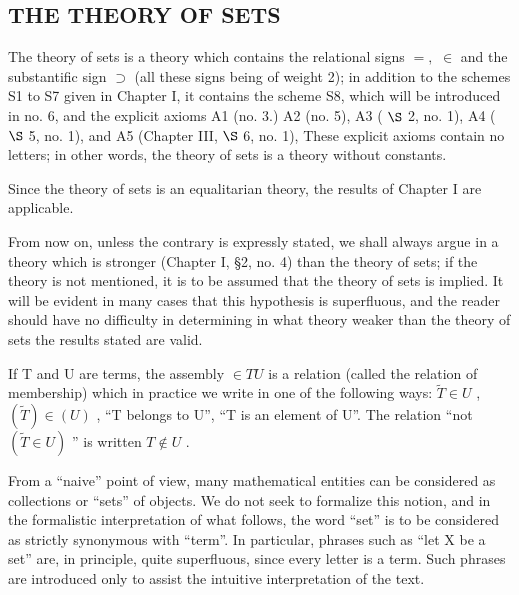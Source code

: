 \subsection{THE THEORY OF SETS}

The theory of sets is a theory which contains the relational signs \(=,\) \(\in\) and the substantific sign \(\supset\) (all these signs being of weight 2); in addition to the schemes S1 to S7 given in Chapter I, it contains the scheme S8, which will be introduced in no. 6, and the explicit axioms A1 (no. 3.) A2 (no. 5), A3 ( \(\S\) 2, no. 1), A4 ( \(\S\) 5, no. 1), and A5 (Chapter III, \(\S\) 6, no. 1), These explicit axioms contain no letters; in other words, the theory of sets is a theory without constants.

Since the theory of sets is an equalitarian theory, the results of Chapter I are applicable.

From now on, unless the contrary is expressly stated, we shall always argue in a theory which is stronger (Chapter I, §2, no. 4) than the theory of sets; if the theory is not mentioned, it is to be assumed that the theory of sets is implied. It will be evident in many cases that this hypothesis is superfluous, and the reader should have no difficulty in determining in what theory weaker than the theory of sets the results stated are valid.

If T and U are terms, the assembly \(\in TU\) is a relation (called the relation of membership) which in practice we write in one of the following ways: \(\widetilde{T} \in U\) , \((\widetilde{T}) \in (U)\) , ``T belongs to U'', ``T is an element of U''. The relation ``not \((\widetilde{T} \in U)\) '' is written \(T \notin U\) .

From a ``naive'' point of view, many mathematical entities can be considered as collections or ``sets'' of objects. We do not seek to formalize this notion, and in the formalistic interpretation of what follows, the word ``set'' is to be considered as strictly synonymous with ``term''. In particular, phrases such as ``let X be a set'' are, in principle, quite superfluous, since every letter is a term. Such phrases are introduced only to assist the intuitive interpretation of the text.

